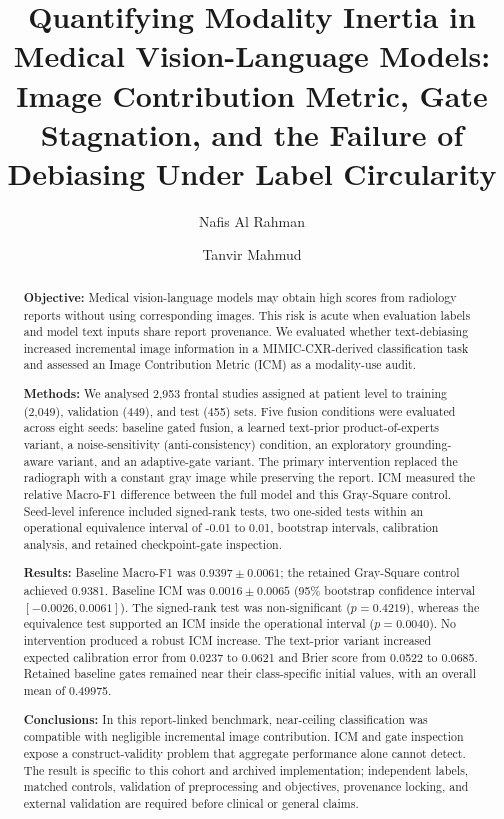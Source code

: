\documentclass[a4paper,fleqn]{cas-sc}
\begin{document}
\title[mode=title]{Quantifying Modality Inertia in Medical Vision-Language Models: Image Contribution Metric, Gate Stagnation, and the Failure of Debiasing Under Label Circularity}

\author{Nafis Al Rahman}
\author{Tanvir Mahmud}

\begin{abstract}
\textbf{Objective:} Medical vision-language models may obtain high scores from
radiology reports without using corresponding images. This risk is acute when
evaluation labels and model text inputs share report provenance. We evaluated
whether text-debiasing increased incremental image information in a
MIMIC-CXR-derived classification task and assessed an Image Contribution Metric
(ICM) as a modality-use audit.

\textbf{Methods:} We analysed 2,953 frontal studies assigned at patient level
to training (2,049), validation (449), and test (455) sets. Five fusion
conditions were evaluated across eight seeds: baseline gated fusion, a learned
text-prior product-of-experts variant, a noise-sensitivity (anti-consistency)
condition, an exploratory
grounding-aware variant, and an adaptive-gate variant. The primary intervention
replaced the radiograph with a constant gray image while preserving the report.
ICM measured the relative Macro-F1 difference between the full model and this
Gray-Square control. Seed-level inference included signed-rank tests, two
one-sided tests within an operational equivalence interval of -0.01 to 0.01,
bootstrap intervals, calibration analysis, and retained checkpoint-gate
inspection.

\textbf{Results:} Baseline Macro-F1 was $0.9397\pm0.0061$; the retained
Gray-Square control achieved 0.9381. Baseline ICM was $0.0016\pm0.0065$
(95\% bootstrap confidence interval $[-0.0026,0.0061]$). The signed-rank test
was non-significant ($p=0.4219$), whereas the equivalence test supported an ICM
inside the operational interval ($p=0.0040$). No intervention produced a
robust ICM increase. The text-prior variant increased expected calibration
error from 0.0237 to 0.0621 and Brier score from 0.0522 to 0.0685. Retained
baseline gates remained near their class-specific initial values, with an
overall mean of 0.49975.

\textbf{Conclusions:} In this report-linked benchmark, near-ceiling
classification was compatible with negligible incremental image contribution.
ICM and gate inspection expose a construct-validity problem that aggregate
performance alone cannot detect. The result is specific to this cohort and
archived implementation; independent labels, matched controls, validation of
preprocessing and objectives, provenance locking, and external validation are
required before clinical or general claims.
\end{abstract}
\end{document}
